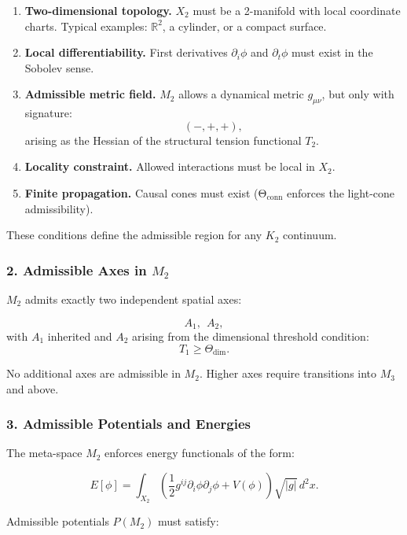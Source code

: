 \begin{enumerate}
    \item \textbf{Two-dimensional topology.}
    $X_2$ must be a 2-manifold with local coordinate charts.
    Typical examples: $\mathbb{R}^2$, a cylinder, or a compact surface.

    \item \textbf{Local differentiability.}
    First derivatives $\partial_i\phi$ and $\partial_t\phi$ must exist in the Sobolev sense.

    \item \textbf{Admissible metric field.}
    $M_2$ allows a dynamical metric $g_{\mu\nu}$, but only with signature:
    \[
    (-,+,+),
    \]
    arising as the Hessian of the structural tension functional $T_2$.

    \item \textbf{Locality constraint.}
    Allowed interactions must be local in $X_2$.

    \item \textbf{Finite propagation.}
    Causal cones must exist (Θ\(_{\text{conn}}\) enforces the light-cone admissibility).
\end{enumerate}

These conditions define the admissible region for any $K_2$ continuum.

\subsubsection*{2. Admissible Axes in \texorpdfstring{$M_2$}{M_2}}

$M_2$ admits exactly two independent spatial axes:

\[
A_1,\ \ A_2,
\]
with $A_1$ inherited and $A_2$ arising from the dimensional threshold condition:
\[
T_1 \ge \Theta_{\text{dim}}.
\]

No additional axes are admissible in $M_2$.
Higher axes require transitions into $M_3$ and above.

\subsubsection*{3. Admissible Potentials and Energies}

The meta-space $M_2$ enforces energy functionals of the form:

\[
E[\phi]
=
\int_{X_2}
\left(
\frac{1}{2} g^{ij} \partial_i \phi \partial_j \phi
+ V(\phi)
\right) \sqrt{|g|}\, d^2x.
\]

Admissible potentials $P(M_2)$ must satisfy:

